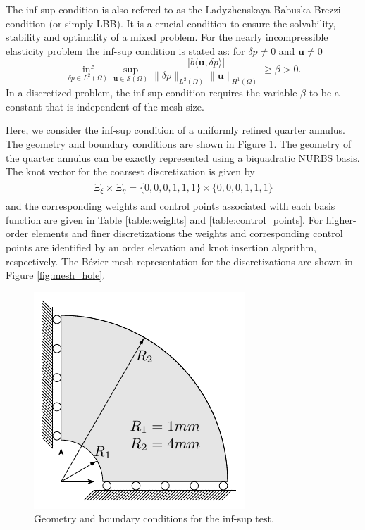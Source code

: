 \documentclass{article}
\begin{document}
\subsubsection{}

The inf-sup condition is also refered to as the Ladyzhenskaya-Babuska-Brezzi condition (or simply LBB). It is a crucial condition to ensure the solvability, stability and optimality of a mixed problem. For the nearly incompressible elasticity problem the inf-sup condition is stated as: for $\delta{p}\neq{0}$ and $\mathbf{u}\neq{0}$
\begin{equation}
    \inf_{\delta{p}\in{L^2(\Omega)}}\sup_{\mathbf{u}\in\mathcal{S}(\Omega)}\dfrac{\vert{b\langle{\mathbf{u},\delta{p}}\rangle}\vert}{\|{\delta{p}}\|_{L^2(\Omega)}\|{\mathbf{u}}\|_{H^1(\Omega)}}\geq\beta>0.
\end{equation}
In a discretized problem, the inf-sup condition requires the variable $\beta$ to be a constant that is independent of the mesh size.\par

Here, we consider the inf-sup condition of a uniformly refined quarter annulus. The geometry and boundary conditions are shown in Figure \ref{fig:quarter_annulus}. The geometry of the quarter annulus can be exactly represented using a biquadratic NURBS basis. The knot vector for the coarsest discretization is given by
\begin{align}
\begin{split}
\Xi_\xi\times\Xi_\eta=\lbrace{0,0,0,1,1,1}\rbrace\times\lbrace{0,0,0,1,1,1}\rbrace
\end{split}
\end{align}
and the corresponding weights and control points associated with each basis function are given in Table \ref{table:weights} and \ref{table:control_points}. For higher-order elements and finer discretizations the weights and corresponding control points are identified by an order elevation and knot insertion algorithm, respectively. The B\'ezier mesh representation for the discretizations are shown in Figure \ref{fig:mesh_hole}.

\begin{figure}[htb!]
	\centering
	\includegraphics[width=0.5\linewidth]{annular}
	\caption{Geometry and boundary conditions for the inf-sup test.}
	\label{fig:quarter_annulus}
\end{figure}
\end{document}
